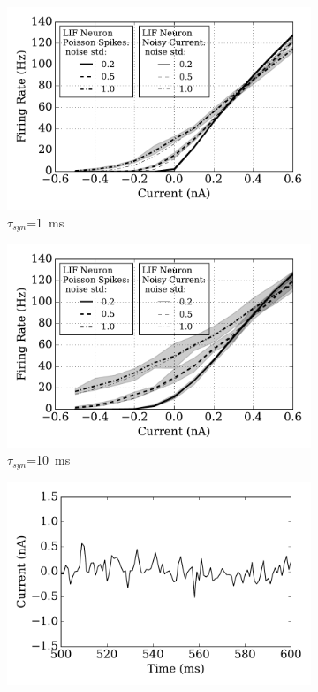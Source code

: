 \begin{figure}[btp!]
	\centering
	\begin{subfigure}[t]{0.49\textwidth}
		\includegraphics[width=\textwidth]{pics_iconip/spiked_curve_1.pdf}
		\caption{$\tau_{syn}$=1~ms}
	\end{subfigure}
	\begin{subfigure}[t]{0.49\textwidth}
		\includegraphics[width=\textwidth]{pics_iconip/spiked_curve_10.pdf}
		\caption{$\tau_{syn}$=10~ms}
	\end{subfigure}
	\begin{subfigure}[t]{0.49\textwidth}
		\includegraphics[width=\textwidth]{pics_iconip/curr_tau1.pdf}

\end{subfigure}
\end{figure}
